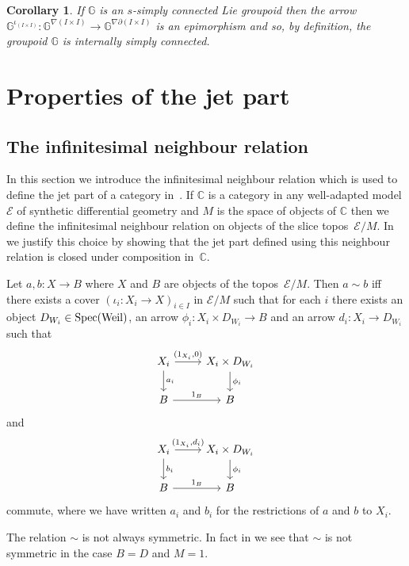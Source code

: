 \documentclass[pdftex]{sigma}
\numberwithin{equation}{section}
\newtheorem{Corollary}[Theorem]{Corollary}
\begin{document}
\begin{Corollary}If $\mathbb{G}$ is an $s$-simply connected Lie groupoid then the arrow $\mathbb{G}^{\iota_{(I\times I)}}\colon \mathbb{G}^{\nabla (I\times I)}\rightarrow \mathbb{G}^{\nabla\partial(I\times I)}$ is an epimorphism and so, by definition, the groupoid $\mathbb{G}$ is internally simply connected.
\end{Corollary}

\section{Properties of the jet part}

\subsection{The inf\/initesimal neighbour relation}\label{sec:infinitesimal-neighbour-relation}

In this section we introduce the inf\/initesimal neighbour relation which is used to def\/ine the jet part of a category in~\cite{burke-relative-to-local-models}. If $\mathbb{C}$ is a category in any well-adapted model $\mathcal{E}$ of synthetic dif\/ferential geometry and $M$ is the space of objects of $\mathbb{C}$ then we def\/ine the inf\/initesimal neighbour relation on objects of the slice topos~$\mathcal{E}/M$. In~\cite{burke-relative-to-local-models} we justify this choice by showing that the jet part def\/ined using this neighbour relation is closed under composition in~$\mathbb{C}$.

Let $a,b\colon X \rightarrow B$ where $X$ and $B$ are objects of the topos~$\mathcal{E}/M$. Then $a\sim b$ if\/f there exists a cover $(\iota_{i}\colon X_{i}\rightarrow X)_{i\in I}$ in ${\mathcal E}/M$ such that for each $i$ there exists an object $D_{W_{i}}\in {\rm Spec}({\rm Weil})$, an arrow $\phi_{i}\colon X_{i}\times D_{W_{i}}\rightarrow B$ and an arrow $d_{i}\colon X_{i}\rightarrow D_{W_{i}}$ such that
\begin{equation*}\begin{tikzcd}
X_{i} \dar{a_{i}} \rar{(1_{X_{i}},0)} & X_{i}\times D_{W_{i}} \dar{\phi_{i}} \\
B \rar{1_{B}} & B
\end{tikzcd}\end{equation*}
and
\begin{equation*}\begin{tikzcd}
X_{i} \dar{b_{i}} \rar{(1_{X_{i}},d_{i})} & X_{i}\times D_{W_{i}} \dar{\phi_{i}} \\
B \rar{1_{B}} & B
\end{tikzcd}\end{equation*}
commute, where we have written $a_i$ and $b_i$ for the restrictions of $a$ and $b$ to $X_i$.
\begin{Remark}
The relation $\sim$ is not always symmetric. In fact in \cite{burke-relative-to-local-models} we see that $\sim$ is not symmetric in the case $B=D$ and $M=1$.
\end{Remark}
\end{document}
